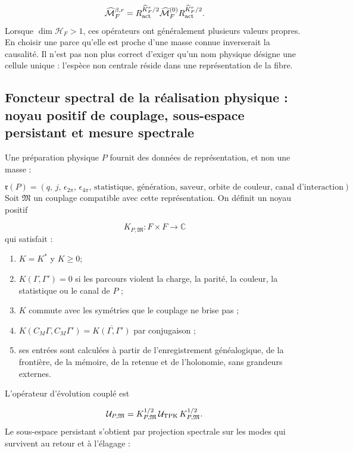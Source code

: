 \[
 \widehat{\mathcal M}_F^{\beta,r}
 =R_{\rm act}^{\widehat K_F^r/2}
  \widehat{\mathcal M}_F^{(0)}
  R_{\rm act}^{\widehat K_F^r/2}.
\]
Lorsque \(\dim\mathcal H_F>1\), ces opérateurs ont généralement plusieurs valeurs propres. En choisir une parce qu'elle est proche d'une masse connue inverserait la causalité. Il n'est pas non plus correct d'exiger qu'un nom physique désigne une cellule unique : l'espèce non centrale réside dans une représentation de la fibre.

\subsection{Foncteur spectral de la réalisation physique : noyau positif de couplage, sous-espace persistant et mesure spectrale}
Une préparation physique \(P\) fournit des données de représentation, et non une masse :

\[
 \mathfrak r(P)=
 (q,\,j,\,\epsilon_{2\pi},\,\epsilon_{4\pi},\,
  \text{statistique},\,\text{génération},\,\text{saveur},\,
  \text{orbite de couleur},\,\text{canal d'interaction}).
\]
Soit \(\mathfrak M\) un couplage compatible avec cette représentation. On définit un noyau positif

\[
 K_{P,\mathfrak M}:F\times F\longrightarrow\mathbb C
\]
qui satisfait :

\begin{enumerate}
\item \(K=K^*\) y \(K\ge0\);
\item \(K(\Gamma,\Gamma')=0\) si les parcours violent la charge, la parité, la couleur, la statistique ou
le canal de \(P\) ;

\item \(K\) commute avec les symétries que le couplage ne brise pas ;
\item \(K(C_M\Gamma,C_M\Gamma')=\overline{K(\Gamma,\Gamma')}\) par conjugaison ;
\item ses entrées sont calculées à partir de l'enregistrement généalogique, de la frontière, de la mémoire, de la retenue et de l'holonomie, sans
grandeurs externes.

\end{enumerate}
L'opérateur d'évolution couplé est

\[
 \mathcal U_{P,\mathfrak M}
 =K_{P,\mathfrak M}^{1/2}\,\mathcal U_{\rm TPK}\,
  K_{P,\mathfrak M}^{1/2}.
\]
Le sous-espace persistant s'obtient par projection spectrale sur les modes qui survivent au retour et à l'élagage :

